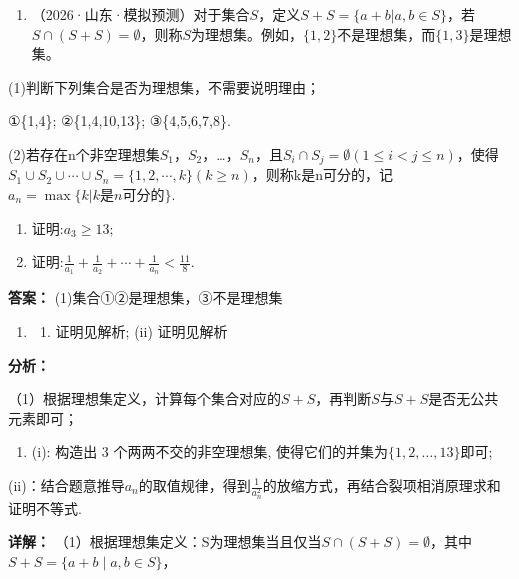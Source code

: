 \documentclass[11pt,a4paper]{ctexart}
\begin{document}
\begin{enumerate}[label=\arabic*., leftmargin=*, start=8]
\item （2026·山东·模拟预测）对于集合\(S\)，定义\(S + S = \{a + b | a, b \in S\}\)，若\(S \cap (S + S) = \emptyset\)，则称\(S\)为理想集。例如，\(\{1,2\}\)不是理想集，而\(\{1,3\}\)是理想集。
\end{enumerate}

(1)判断下列集合是否为理想集，不需要说明理由；

①\{1,4\}; ②\{1,4,10,13\}; ③\{4,5,6,7,8\}.

(2)若存在n个非空理想集\(S_{1}\)，\(S_{2}\)，\ldots，\(S_{n}\)，且\(S_{i}\cap S_{j}=\emptyset(1\leq i<j\leq n)\)，使得\(S_{1}\cup S_{2}\cup\cdots\cup S_{n}=\{1,2,\cdots,k\}(k\geq n)\)，则称k是n可分的，记\(a_{n}=\max\{k|k是n可分的\}\).

\begin{enumerate}[label=(\roman*), leftmargin=*]
\item 证明:\(a_{3} \geq 13\);
\item
  证明:\(\frac{1}{a_1} + \frac{1}{a_2} + \cdots + \frac{1}{a_n} < \frac{11}{8}\).
\end{enumerate}

\textbf{答案：}
(1)集合①②是理想集，③不是理想集

\begin{enumerate}[label=\arabic*., leftmargin=*, start=2]
\item 

\begin{enumerate}
  \def\labelenumii{(\roman{enumii})}
  \item
    证明见解析; (ii) 证明见解析
  \end{enumerate}
\end{enumerate}

\textbf{分析：}

（1）根据理想集定义，计算每个集合对应的\(S + S\)，再判断\(S\)与\(S + S\)是否无公共元素即可；

\begin{enumerate}[label=\arabic*., leftmargin=*, start=2]
\item (i): 构造出 3 个两两不交的非空理想集,
  使得它们的并集为\(\{1,2,\ldots,13\}\)即可;
\end{enumerate}

(ii)：结合题意推导\(a_{n}\)的取值规律，得到\(\frac{1}{a_{n}^{2}}\)的放缩方式，再结合裂项相消原理求和证明不等式.

\textbf{详解：}
（1）根据理想集定义：S为理想集当且仅当\(S \cap (S + S) = \emptyset\)，其中\(S + S = \{a + b \mid a, b \in S\}\)，
\end{document}
